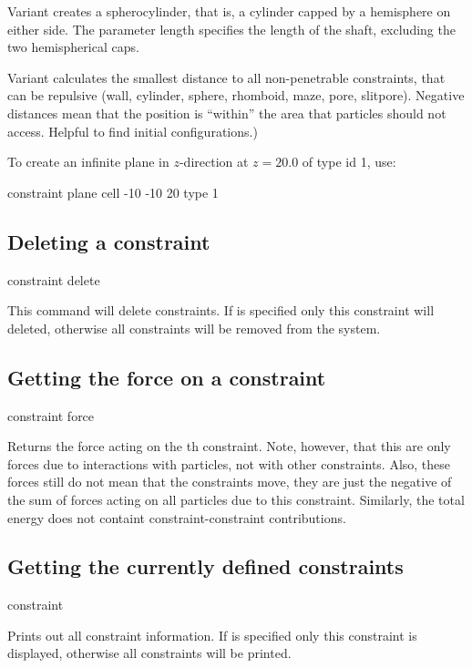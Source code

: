Variant  creates a spherocylinder, that is, a cylinder capped by a hemisphere on either side. The parameter length  specifies the length of the shaft, excluding the two hemispherical caps. 

Variant  calculates the smallest distance to all non-penetrable
constraints, that can be repulsive (wall, cylinder, sphere, rhomboid, maze, pore, slitpore).
Negative distances mean that the position is ``within'' the area that
particles should not access. Helpful to find initial configurations.) 

To create an infinite plane in $z$-direction at $z=20.0$ of type id 1,
use:
\begin{code}
  constraint plane cell -10 -10 20 type 1
\end{code}

\subsection{Deleting a constraint}
\begin{essyntax}
  constraint delete  
\end{essyntax}

This command will delete constraints. If  is specified only this
constraint will deleted, otherwise all constraints will be removed from the
system. 

\subsection{Getting the force on a constraint}
\begin{essyntax}
constraint force  
\end{essyntax}
Returns the force acting on the th constraint. Note, however, that this
are only forces due to interactions with particles, not with other constraints.
Also, these forces still do not mean that the constraints move, they are just
the negative of the sum of forces acting on all particles due to this constraint.
Similarly, the total energy does not containt constraint-constraint contributions.


\subsection{Getting the currently defined constraints}
\begin{essyntax}
constraint   
\end{essyntax}
Prints out all constraint information. If  is specified only this
constraint is displayed, otherwise all constraints will be printed.

